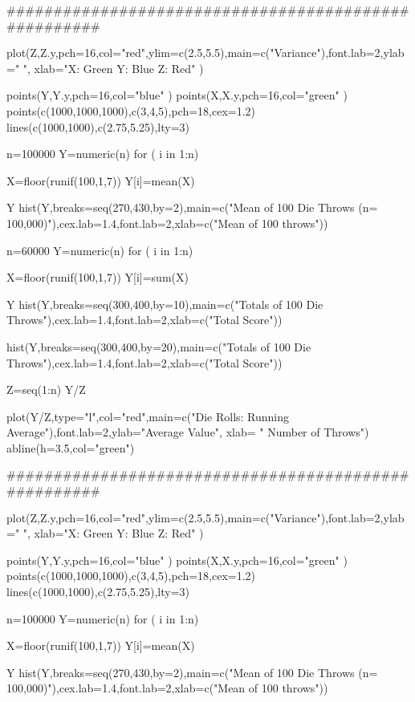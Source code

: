 #####################################################

plot(Z,Z.y,pch=16,col="red",ylim=c(2.5,5.5),main=c("Variance"),font.lab=2,ylab=" ", xlab="X: Green  Y: Blue  Z: Red" )

points(Y,Y.y,pch=16,col="blue" )
points(X,X.y,pch=16,col="green" )
points(c(1000,1000,1000),c(3,4,5),pch=18,cex=1.2)
lines(c(1000,1000),c(2.75,5.25),lty=3)



n=100000
Y=numeric(n)
for ( i in 1:n){

X=floor(runif(100,1,7))
Y[i]=mean(X)
}

Y
hist(Y,breaks=seq(270,430,by=2),main=c("Mean of 100 Die Throws (n= 100,000)"),cex.lab=1.4,font.lab=2,xlab=c("Mean of 100 throws")) 

\newpage


n=60000
Y=numeric(n)
for ( i in 1:n){

X=floor(runif(100,1,7))
Y[i]=sum(X)
}

Y
hist(Y,breaks=seq(300,400,by=10),main=c("Totals of 100 Die Throws"),cex.lab=1.4,font.lab=2,xlab=c("Total Score"))

hist(Y,breaks=seq(300,400,by=20),main=c("Totals of 100 Die Throws"),cex.lab=1.4,font.lab=2,xlab=c("Total Score"))



Z=seq(1:n)
Y/Z

plot(Y/Z,type="l",col="red",main=c("Die Rolls: Running Average"),font.lab=2,ylab="Average Value", xlab=
" Number of Throws")
abline(h=3.5,col="green")


#####################################################

plot(Z,Z.y,pch=16,col="red",ylim=c(2.5,5.5),main=c("Variance"),font.lab=2,ylab=" ", xlab="X: Green  Y: Blue  Z: Red" )

points(Y,Y.y,pch=16,col="blue" )
points(X,X.y,pch=16,col="green" )
points(c(1000,1000,1000),c(3,4,5),pch=18,cex=1.2)
lines(c(1000,1000),c(2.75,5.25),lty=3)



n=100000
Y=numeric(n)
for ( i in 1:n){

X=floor(runif(100,1,7))
Y[i]=mean(X)
}

Y
hist(Y,breaks=seq(270,430,by=2),main=c("Mean of 100 Die Throws (n= 100,000)"),cex.lab=1.4,font.lab=2,xlab=c("Mean of 100 throws")) 

